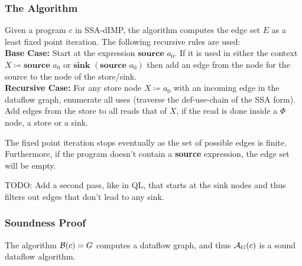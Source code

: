 \subsubsection*{The Algorithm}
Given a program $c$ in SSA-dIMP, the algorithm computes
the edge set $E$ as a least fixed point iteration.
The following recursive rules are used:\\
\textbf{Base Case:} Start at the expression $\textbf{source }a_0$.
If it is used in either the context $X \coloneqq \textbf{source }a_0$
or $\textbf{sink }(\textbf{source }a_0)$ then add an edge from the node for the
source to the node of the store/sink.\\
\textbf{Recursive Case:} For any store node $X \coloneqq a_0$ with an incoming edge
in the dataflow graph, enumerate all uses (traverse
the def-use-chain of the SSA form). Add edges from the store to all reads that of $X$,
if the read is done inside a $\Phi$ node, a store or a sink.

The fixed point iteration stops eventually as the set of possible edges is
finite. Furthermore, if the program doesn't contain a \textbf{source} expression,
the edge set will be empty.

TODO: Add a second pass, like in QL, that starts at the sink nodes and thus
filters out edges that don't lead to any sink.

\subsubsection*{Soundness Proof}
\begin{theorem}
    The algorithm $\operatorname{\mathcal{B}}(c) = G$ computes a dataflow graph, and thus 
    $\operatorname{\mathcal{A}}_G(c)$ is a sound dataflow algorithm.
\end{theorem}



